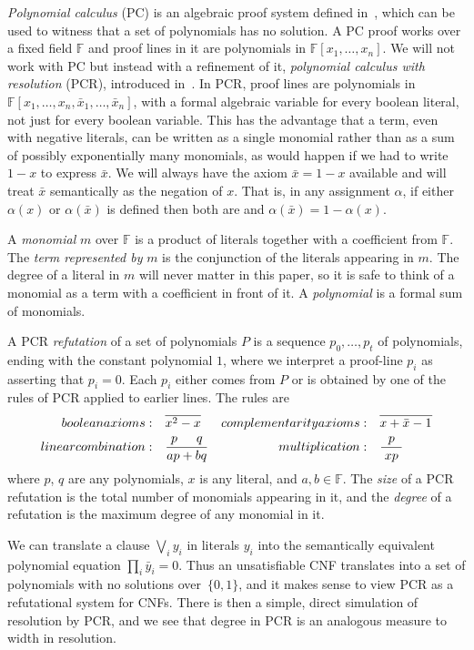 \documentclass[11pt]{article}
\numberwithin{equation}{section}
\theoremstyle{definition}
\theoremstyle{plain}
\newcommand\bbF{\mathbb{F}}
\begin{document}
 
\emph{Polynomial calculus} (PC) is an algebraic proof system defined in~\cite{DBLP:conf/stoc/CleggEI96},
which can be used to witness that a set of polynomials has no solution.
A PC proof  works over a fixed field $\bbF$ and proof lines in it are polynomials in $\bbF[x_1,\ldots,x_n]$. 
We will not work with PC but instead with a refinement of it, 
\emph{polynomial calculus with resolution} (PCR), introduced in~\cite{ABRW}.
In PCR, proof lines are polynomials in $\bbF[x_1, \dots, x_n, \bar{x}_1, \dots, \bar{x}_n]$,
with a formal algebraic variable for every boolean literal, not just for every boolean variable.
This has the advantage that a term, even with negative literals, 
can be written as a single monomial rather than as
a sum of possibly exponentially many monomials, as would happen if we had to write  $1-x$
to express $\bar{x}$. We will always have the axiom $\bar{x} = 1-x$ available and will treat 
$\bar{x}$ semantically as the negation of $x$. That is, in any assignment $\alpha$,
 if either $\alpha(x)$ or $\alpha(\bar{x})$ is defined then both 
are and $\alpha(\bar{x}) = 1-\alpha(x)$.

A \emph{monomial} $m$ over $\bbF$ is a product of literals together with a coefficient from $\bbF$.
The \emph{term represented by} $m$ is the conjunction of the literals appearing in $m$.
The degree of a literal in $m$ will never matter in this paper, so it is safe to think of a monomial
as a term with a coefficient in front of it. A \emph{polynomial} is a formal sum of monomials.

A PCR \emph{refutation} of a set of polynomials $P$
is a sequence $p_0, \dots, p_t$ of polynomials, ending with the constant polynomial $1$,
 where we interpret a proof-line $p_i$ as asserting
that $p_i =0$.
Each $p_i$ either comes from $P$ or is obtained by one of the rules
of PCR applied to earlier lines. The rules are
\begin{align*}
\textbf{boolean axioms:} &\quad  \overline{x^2-x}& 
\textbf{complementarity axioms:} & \quad \overline{x+\bar{x}-1^{\vphantom 2}} \\
\textbf{linear combination:} &\quad \frac{p \quad \, \, \, q}{ap+bq}  &
\textbf{multiplication:} &\quad \frac{\;\; p \;\;}{xp}
\end{align*}
where $p$, $q$ are any polynomials, $x$ is any literal, and $a,b\in\bbF$.
The \emph{size} of a PCR refutation is the total number of monomials appearing in it,
and the \emph{degree} of a refutation is the maximum degree of any monomial in it.

We can translate a clause $\bigvee_i y_i$ in literals $y_i$
into the semantically equivalent polynomial equation $\prod_i  \bar{y}_i = 0$.
Thus an unsatisfiable CNF translates into
 a set of polynomials with no solutions 
over~$\{0,1\}$, and it makes sense to view PCR as a refutational system for CNFs.
There is then a simple, direct simulation of resolution by PCR, and we see that
degree in PCR is an analogous measure to width in resolution.
\end{document}
